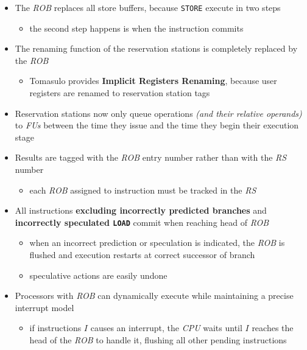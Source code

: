 \documentclass[english]{article}
\begin{document}
\begin{itemize}
  \item The \textit{ROB} replaces all store buffers, because \texttt{STORE} execute in two steps
        \begin{itemize}
          \item the second step happens is when the instruction commits
        \end{itemize}
  \item The renaming function of the reservation stations is completely replaced by the \textit{ROB}
        \begin{itemize}
          \item Tomasulo provides \textbf{Implicit Registers Renaming}, because user registers are renamed to reservation station tags
        \end{itemize}
  \item Reservation stations now only queue operations \textit{(and their relative operands)} to \textit{FUs} between the time they issue and the time they begin their execution stage
  \item Results are tagged with the \textit{ROB} entry number rather than with the \textit{RS} number
        \begin{itemize}
          \item each \textit{ROB} assigned to instruction must be tracked in the \textit{RS}
        \end{itemize}
  \item All instructions \textbf{excluding incorrectly predicted branches} and \textbf{incorrectly speculated \texttt{LOAD}} commit when reaching head of \textit{ROB}
        \begin{itemize}
          \item when an incorrect prediction or speculation is indicated, the \textit{ROB} is flushed and execution restarts at correct successor of branch
          \item speculative actions are easily undone
        \end{itemize}
  \item Processors with \textit{ROB} can dynamically execute while maintaining a precise interrupt model
        \begin{itemize}
          \item if instructions \(I\) causes an interrupt, the \textit{CPU} waits until \(I\) reaches the head of the \textit{ROB} to handle it, flushing all other pending instructions
        \end{itemize}
\end{itemize}
\end{document}
